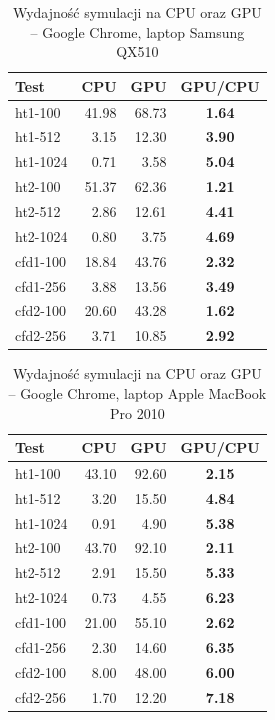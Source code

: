 \begin{table}[!htp]
\caption{Wydajność symulacji na CPU oraz GPU -- Google Chrome, laptop Samsung QX510}
\centering
\begin{tabular}{|l|r|r|>{\bfseries}c|}
\hline
\cellcolor{t} Test & \cellcolor{cpu} CPU & \cellcolor{gpu} GPU & \cellcolor{gc} GPU/CPU \\ \hline
ht1-100 & 41.98 & 68.73 & 1.64 \\ \hline
ht1-512 & 3.15 & 12.30 & 3.90 \\ \hline
ht1-1024 & 0.71 & 3.58 & 5.04 \\ \hline
ht2-100 & 51.37 & 62.36 & 1.21 \\ \hline
ht2-512 & 2.86 & 12.61 & 4.41 \\ \hline
ht2-1024 & 0.80 & 3.75 & 4.69 \\ \hline
\hline
cfd1-100 & 18.84 & 43.76 & 2.32 \\ \hline
cfd1-256 & 3.88 & 13.56 & 3.49 \\ \hline
cfd2-100 & 20.60 & 43.28 & 1.62 \\ \hline
cfd2-256 & 3.71 & 10.85 & 2.92 \\ \hline
\end{tabular}
\label{tab:wynikiWebGL_first}
\end{table}

\begin{table}[!htp]
\caption{Wydajność symulacji na CPU oraz GPU -- Google Chrome, laptop Apple MacBook Pro 2010}
\centering
\begin{tabular}{|l|r|r|>{\bfseries}c|}
\hline
\cellcolor{t} Test & \cellcolor{cpu} CPU & \cellcolor{gpu} GPU & \cellcolor{gc} GPU/CPU \\ \hline
ht1-100 & 43.10 & 92.60 & 2.15 \\ \hline
ht1-512 & 3.20 & 15.50 & 4.84 \\ \hline
ht1-1024 & 0.91 & 4.90 & 5.38 \\ \hline
ht2-100 & 43.70 & 92.10 & 2.11 \\ \hline
ht2-512 & 2.91 & 15.50 & 5.33 \\ \hline
ht2-1024 & 0.73 & 4.55 & 6.23 \\ \hline
\hline
cfd1-100 & 21.00 & 55.10 & 2.62 \\ \hline
cfd1-256 & 2.30 & 14.60 & 6.35 \\ \hline
cfd2-100 & 8.00 & 48.00 & 6.00 \\ \hline
cfd2-256 & 1.70 & 12.20 & 7.18 \\ \hline
\end{tabular}
\label{tab:wynikiWebGL_2}
\end{table}

